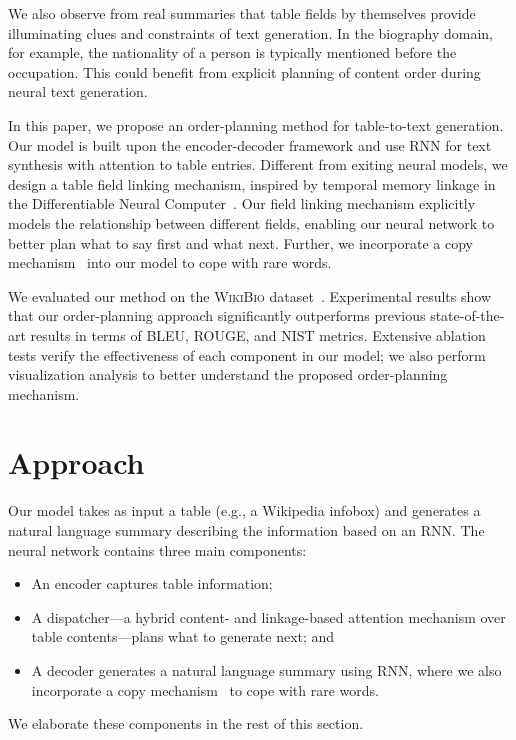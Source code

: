 \documentclass[letterpaper]{article} %
\begin{document}
We also observe from real summaries that table fields by themselves provide illuminating clues and constraints of text generation. In the biography domain, for example, the nationality of a person is typically mentioned before the occupation. This could benefit from explicit planning of content order during neural text generation.

In this paper, we propose an order-planning method for table-to-text generation. Our model is built upon the encoder-decoder framework and use RNN for text synthesis with attention to table entries. Different from exiting neural models, we design a table field linking mechanism, inspired by temporal memory linkage in the Differentiable Neural Computer~\cite[DNC]{DNC}. Our field linking mechanism explicitly models the relationship between different fields, enabling our neural network to better plan what to say first and what next. Further, we  incorporate a copy mechanism~\cite{copynet} into our model to cope with rare words.


We evaluated our method on the \textsc{WikiBio} dataset~\cite{wikibio}. Experimental results show that our order-planning approach significantly outperforms previous state-of-the-art results in terms of BLEU, ROUGE, and NIST metrics. Extensive ablation tests verify the effectiveness of each component in our model; we also perform visualization analysis to  better understand the proposed order-planning mechanism.

\section{Approach}



Our model takes as input a table (e.g., a Wikipedia infobox) and generates a natural language summary describing the information based on an RNN. The neural network contains three main components:
\begin{itemize}
	\item An encoder captures table information;
	\item A dispatcher---a hybrid content- and linkage-based attention mechanism over table contents---plans what to generate next; and
	\item A decoder generates a natural language summary using RNN, where we also incorporate a copy mechanism~\cite{copynet} to cope with rare words.
\end{itemize}
We elaborate these components in the rest of this section.
\end{document}
